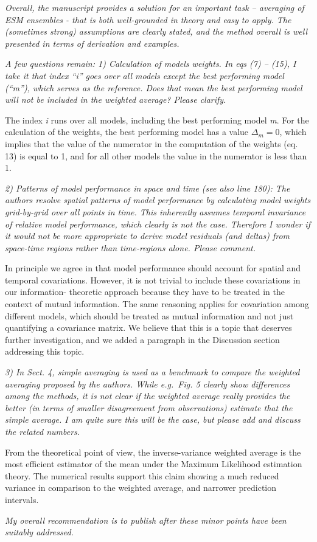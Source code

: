 \emph{Overall, the manuscript provides a solution for an important task
-- averaging of ESM ensembles - that is both well-grounded in theory and
easy to apply. The (sometimes strong) assumptions are clearly stated,
and the method overall is well presented in terms of derivation and
examples.}

\emph{A few questions remain: 1) Calculation of models weights. In eqs
(7) -- (15), I take it that index ``i'' goes over all models except the
best performing model (``m''), which serves as the reference. Does that
mean the best performing model will not be included in the weighted
average? Please clarify.}

The index \emph{i} runs over all models, including the best performing
model \emph{m}. For the calculation of the weights, the best performing
model has a value \(\Delta_m =0\), which implies that the value of the
numerator in the computation of the weights (eq. 13) is equal to 1, and
for all other models the value in the numerator is less than 1.

\emph{2) Patterns of model performance in space and time (see also line
180): The authors resolve spatial patterns of model performance by
calculating model weights grid-by-grid over all points in time. This
inherently assumes temporal invariance of relative model performance,
which clearly is not the case. Therefore I wonder if it would not be
more appropriate to derive model residuals (and deltas) from space-time
regions rather than time-regions alone. Please comment.}

In principle we agree in that model performance should account for
spatial and temporal covariations. However, it is not trivial to include
these covariations in our information- theoretic approach because they
have to be treated in the context of mutual information. The same
reasoning applies for covariation among different models, which should
be treated as mutual information and not just quantifying a covariance
matrix. We believe that this is a topic that deserves further
investigation, and we added a paragraph in the Discussion section
addressing this topic.

\emph{3) In Sect. 4, simple averaging is used as a benchmark to compare
the weighted averaging proposed by the authors. While e.g.~Fig. 5
clearly show differences among the methods, it is not clear if the
weighted average really provides the better (in terms of smaller
disagreement from observations) estimate that the simple average. I am
quite sure this will be the case, but please add and discuss the related
numbers.}

From the theoretical point of view, the inverse-variance weighted
average is the most efficient estimator of the mean under the Maximum
Likelihood estimation theory. The numerical results support this claim
showing a much reduced variance in comparison to the weighted average,
and narrower prediction intervals.

\emph{My overall recommendation is to publish after these minor points
have been suitably addressed.}
